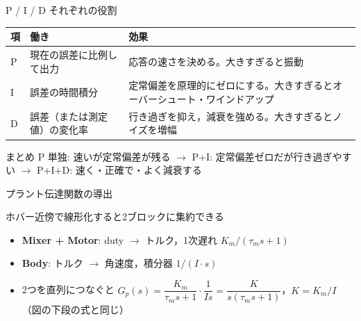 \begin{frame}{P / I / D それぞれの役割\later}
  \begin{table}
    \centering\footnotesize
    \begin{tabular}{@{}l >{\raggedright\arraybackslash}p{40mm} >{\raggedright\arraybackslash}p{58mm}@{}}
      \hline
      \textbf{項} & \textbf{働き} & \textbf{効果} \\
      \hline
      P & 現在の誤差に比例して出力 & 応答の速さを決める。大きすぎると振動 \\
      I & 誤差の時間積分 & 定常偏差を原理的にゼロにする。大きすぎるとオーバーシュート・ワインドアップ \\
      D & 誤差（または測定値）の変化率 & 行き過ぎを抑え，減衰を強める。大きすぎるとノイズを増幅 \\
      \hline
    \end{tabular}
  \end{table}

  \vspace{0.5em}

  \begin{exampleblock}{まとめ}\footnotesize
    P 単独: 速いが定常偏差が残る $\to$ P+I: 定常偏差ゼロだが行き過ぎやすい
    $\to$ P+I+D: 速く・正確で・よく減衰する
  \end{exampleblock}
\end{frame}


\begin{frame}{プラント伝達関数の導出}
  \begin{center}
    \vspace{-2mm}
  \end{center}

  \vspace{-0.3em}

  \begin{exampleblock}{ホバー近傍で線形化すると2ブロックに集約できる}\footnotesize
    \begin{itemize}\setlength{\itemsep}{0.2em}
      \item \textbf{Mixer + Motor}: duty $\to$ トルク，1次遅れ $K_m/(\tau_m s+1)$
      \item \textbf{Body}: トルク $\to$ 角速度，積分器 $1/(I \cdot s)$
      \item 2つを直列につなぐと $G_p(s)=\dfrac{K_m}{\tau_m s+1}\cdot\dfrac{1}{Is}
            =\dfrac{K}{s(\tau_m s+1)}$，$K=K_m/I$（図の下段の式と同じ）
    \end{itemize}
  \end{exampleblock}
\end{frame}

